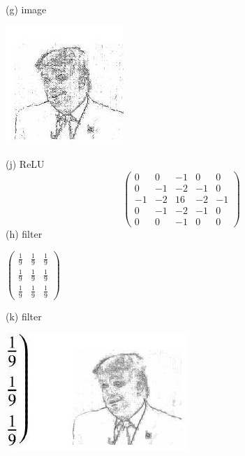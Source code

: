 \documentclass[10pt]{article}
\begin{document}
(g) image

\includegraphics[max width=\textwidth]{2022_01_06_b5ce182ed1bd5f482e5bg-15(5)}

(j) ReLU
$$
\left(\begin{array}{ccccc}
0 & 0 & -1 & 0 & 0 \\
0 & -1 & -2 & -1 & 0 \\
-1 & -2 & 16 & -2 & -1 \\
0 & -1 & -2 & -1 & 0 \\
0 & 0 & -1 & 0 & 0
\end{array}\right)
$$
(h) filter

$\left(\begin{array}{lll}\frac{1}{9} & \frac{1}{9} & \frac{1}{9} \\ \frac{1}{9} & \frac{1}{9} & \frac{1}{9} \\ \frac{1}{9} & \frac{1}{9} & \frac{1}{9}\end{array}\right)$

(k) filter

\includegraphics[max width=\textwidth]{2022_01_06_b5ce182ed1bd5f482e5bg-15(6)}
\end{document}
